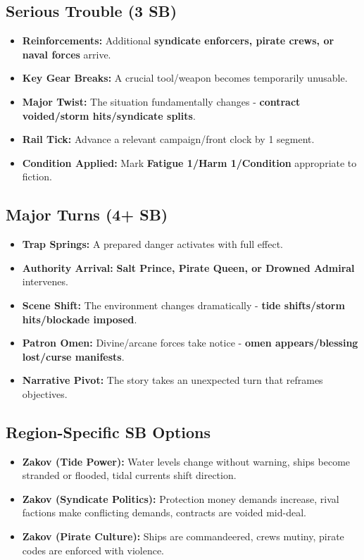 \subsection*{Serious Trouble (3 SB)}
\begin{itemize}
\item \textbf{Reinforcements:} Additional \textbf{syndicate enforcers, pirate crews, or naval forces} arrive.
\item \textbf{Key Gear Breaks:} A crucial tool/weapon becomes temporarily unusable.
\item \textbf{Major Twist:} The situation fundamentally changes - \textbf{contract voided/storm hits/syndicate splits}.
\item \textbf{Rail Tick:} Advance a relevant campaign/front clock by 1 segment.
\item \textbf{Condition Applied:} Mark \textbf{Fatigue 1/Harm 1/Condition} appropriate to fiction.
\end{itemize}

\subsection*{Major Turns (4+ SB)}
\begin{itemize}
\item \textbf{Trap Springs:} A prepared danger activates with full effect.
\item \textbf{Authority Arrival:} \textbf{Salt Prince, Pirate Queen, or Drowned Admiral} intervenes.
\item \textbf{Scene Shift:} The environment changes dramatically - \textbf{tide shifts/storm hits/blockade imposed}.
\item \textbf{Patron Omen:} Divine/arcane forces take notice - \textbf{omen appears/blessing lost/curse manifests}.
\item \textbf{Narrative Pivot:} The story takes an unexpected turn that reframes objectives.
\end{itemize}

\subsection*{Region-Specific SB Options}
\begin{itemize}
\item \textbf{Zakov (Tide Power):} Water levels change without warning, ships become stranded or flooded, tidal currents shift direction.
\item \textbf{Zakov (Syndicate Politics):} Protection money demands increase, rival factions make conflicting demands, contracts are voided mid-deal.
\item \textbf{Zakov (Pirate Culture):} Ships are commandeered, crews mutiny, pirate codes are enforced with violence.
\end{itemize}

